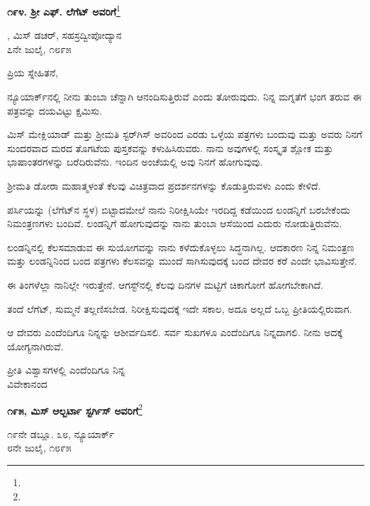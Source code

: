 \begin{center}
\textbf{೧೯೪. ಶ‍್ರೀ ಎಫ್. ಲೆಗೆಟ್ ಅವರಿಗೆ}\footnote{}
\end{center}

\begin{flushright}
, ಮಿಸ್‌ ಡಚರ್‌, ಸಹಸ್ರದ್ವೀಪೋದ್ಯಾನ\\೭ನೇ ಜುಲೈ, ೧೮೯೫
\end{flushright}

\noindent
ಪ್ರಿಯ ಸ್ನೇಹಿತನೆ,

ನ್ಯೂಯಾರ್ಕ್‌ನಲ್ಲಿ ನೀನು ತುಂಬಾ ಚೆನ್ನಾಗಿ ಆನಂದಿಸುತ್ತಿರುವೆ ಎಂದು ತೋರುವುದು. ನಿನ್ನ ಮಗ್ನತೆಗೆ ಭಂಗ ತರುವ ಈ ಪತ್ರವನ್ನು ದಯವಿಟ್ಟು ಕ್ಷಮಿಸು.

ಮಿಸ್ ಮೇಕ್ಲಿಯಾಡ್ ಮತ್ತು ಶ‍್ರೀಮತಿ ಸ್ಟರ್‌ಗಿಸ್ ಅವರಿಂದ ಎರಡು ಒಳ್ಳೆಯ ಪತ್ರಗಳು ಬಂದುವು ಮತ್ತು ಅವರು ನಿನಗೆ ಸುಂದರವಾದ ಮರದ ತೊಗಟೆಯ  ಪುಸ್ತಕವನ್ನು ಕಳುಹಿಸಿರುವರು. ನಾನು ಅವುಗಳಲ್ಲಿ ಸಂಸ್ಕೃತ ಶ್ಲೋಕ ಮತ್ತು ಭಾಷಾಂತರಗಳನ್ನು ಬರೆದಿರುವೆನು. ಇಂದಿನ ಅಂಚೆಯಲ್ಲಿ ಅವು ನಿನಗೆ ಹೋಗುವುವು.

ಶ‍್ರೀಮತಿ ಡೋರಾ ಮಹಾತ್ಮಳಂತೆ ಕೆಲವು ವಿಚಿತ್ರವಾದ ಪ್ರದರ್ಶನಗಳನ್ನು ಕೊಡುತ್ತಿರುವಳು ಎಂದು ಕೇಳಿದೆ.

ಪರ್ಸಿಯನ್ನು (ಲೆಗೆಟ್‌ನ ಸ್ಥಳ) ಬಿಟ್ಟಾದಮೇಲೆ ನಾನು ನಿರೀಕ್ಷಿಸಿಯೇ ಇರದಿದ್ದ ಕಡೆಯಿಂದ ಲಂಡನ್ನಿಗೆ ಬರಬೇಕೆಂದು ನಿಮಂತ್ರಣಗಳು ಬಂದಿವೆ. ಲಂಡನ್ನಿಗೆ ಹೋಗುವುದನ್ನು ನಾನು ತುಂಬಾ ಆಸೆಯಿಂದ ಎದುರು ನೋಡುತ್ತಿರುವೆನು.

ಲಂಡನ್ನಿನಲ್ಲಿ ಕೆಲಸಮಾಡುವ ಈ ಸುಯೋಗವನ್ನು ನಾನು ಕಳೆದುಕೊಳ್ಳಲು ಸಿದ್ಧನಾಗಿಲ್ಲ. ಆದಕಾರಣ ನಿನ್ನ ನಿಮಂತ್ರಣ ಮತ್ತು ಲಂಡನ್ನಿನಿಂದ ಬಂದ ಪತ್ರಗಳು ಕೆಲಸವನ್ನು ಮುಂದೆ ಸಾಗಿಸುವುದಕ್ಕೆ ಬಂದ ದೇವರ ಕರೆ ಎಂದೇ ಭಾವಿಸುತ್ತೇನೆ.

ಈ ತಿಂಗಳೆಲ್ಲಾ ನಾನಿಲ್ಲೇ ಇರುತ್ತೇನೆ. ಆಗಸ್ಟ್‌ನಲ್ಲಿ ಕೆಲವು ದಿನಗಳ ಮಟ್ಟಿಗೆ ಚಿಕಾಗೋಗೆ ಹೋಗಬೇಕಾಗಿದೆ.

ತಂದೆ ಲೆಗೆಟ್, ಸುಮ್ಮನೆ ತಲ್ಲಣಿಸಬೇಡ. ನಿರೀಕ್ಷಿಸುವುದಕ್ಕೆ ಇದೇ ಸಕಾಲ, ಅದೂ ಅಲ್ಲದೆ ಒಬ್ಬ ಪ್ರೀತಿಯಲ್ಲಿರುವಾಗ.

ಆ ದೇವರು ಎಂದೆಂದಿಗೂ ನಿನ್ನನ್ನು ಆಶೀರ್ವದಿಸಲಿ. ಸರ್ವ ಸುಖಗಳೂ ಎಂದೆಂದಿಗೂ ನಿನ್ನದಾಗಲಿ. ನೀನು ಅದಕ್ಕೆ ಯೋಗ್ಯನಾಗಿರುವೆ.

{\flushright
ಪ್ರೀತಿ ವಿಶ್ವಾಸಗಳಲ್ಲಿ ಎಂದೆಂದಿಗೂ ನಿನ್ನ\\ವಿವೇಕಾನಂದ\par}

\begin{center}
\textbf{೧೯೫, ಮಿಸ್ ಆಲ್ಬರ್ಟಾ ಸ್ಟರ್ಗಿಸ್ ಅವರಿಗೆ}\footnote{}
\end{center}

\begin{flushright}
೧೯ನೇ ಡಬ್ಲೂ. ೩೮, ನ್ಯೂಯಾರ್ಕ್\\೮ನೇ ಜುಲೈ, ೧೮೯೫
\end{flushright}

